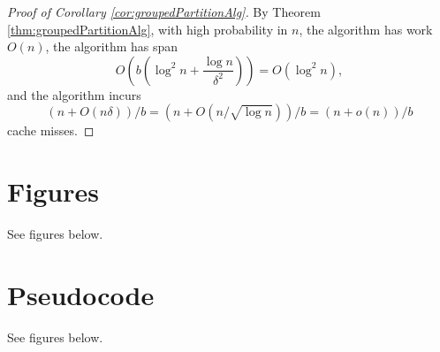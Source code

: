\documentclass[twoside,leqno,twocolumn]{article}
\begin{document}
\begin{proof}[Proof of Corollary \ref{cor:groupedPartitionAlg}]
  By Theorem \ref{thm:groupedPartitionAlg}, with high probability
  in $n$, the algorithm has work $O(n)$, the algorithm has span
  $$O\left(b\left(\log^2 n + \frac{\log
  n}{\delta^2}\right)\right) = O(\log^2 n),$$ and the algorithm
  incurs $$(n+O(n\delta))/b = (n+O(n/\sqrt{\log n}))/b =
  (n+o(n))/b$$ cache misses.
\end{proof}



\section{Figures}\label{sec:figures}
See figures below.

\section{Pseudocode}\label{sec:pseudocode}
See figures below.

\begin{figure*}[h]
  \begin{center}
    \CILKtable 
  \end{center}
    \caption{For a fixed table-size $n = 2^{30}$, we compare each
      implementation's runtime to the Libc serial baseline, which takes 3.9
      seconds to complete (averaged over five trials). The $x$-axis
      plots the number of worker threads being used, and the $y$-axis
      plots the multiplicative speedup over the serial baseline. Each
      time (including the serial baseline) is averaged over five trials.}
      \label{tablecilk}
\end{figure*}

\end{document}
